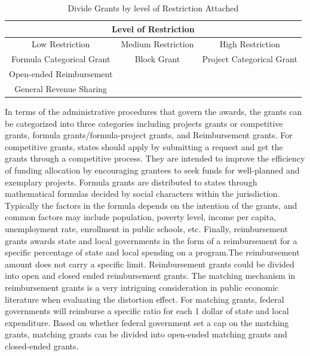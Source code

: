 \begin{table}[H]
    \centering
    \caption{Divide Grants by level of Restriction Attached}
      \begin{tabular}{ccc}
      \toprule
      \multicolumn{3}{c}{Level of Restriction} \\
      \midrule
      Low Restriction  & Medium Restriction  & High Restriction \\
      \midrule
      Formula Categorical Grant & Block Grant & Project Categorical Grant \\
      Open-ended Reimbursement  &       &  \\
      General Revenue Sharing &       &  \\
      \bottomrule
      \end{tabular}%
    \label{Table 1.1}%
  \end{table}%
  
  

In terms of the administrative procedures that govern the awards, the grants can be categorized into three categories including projects grants or competitive grants, formula grants/formula-project grants, and Reimbursement grants. For competitive grants, states should apply by submitting a request and get the grants through a competitive process. They are intended to improve the efficiency of funding allocation by encouraging grantees to seek funds for well-planned and exemplary projects. Formula grants are distributed to states through mathematical formulas decided by social characters within the jurisdiction. Typically the factors in the formula depends on the intention of the grants, and common factors may include population, poverty level, income per capita, unemployment rate, enrollment in public schools, etc. Finally, reimbursement grants awards state and local governments in the form of a reimbursement for a specific percentage of state and local spending on a program.The reimbursement amount does not carry a specific limit. Reimbursement grants could be divided into open and closed ended reimbursement grants. The matching mechanism in reimbursement grants is a very intriguing consideration in public economic literature when evaluating the distortion effect. For matching grants, federal governments will reimburse a specific ratio for each 1 dollar of state and local expenditure. Based on whether federal government set a cap on the matching grants, matching grants can be divided into open-ended matching grants and closed-ended grants.



